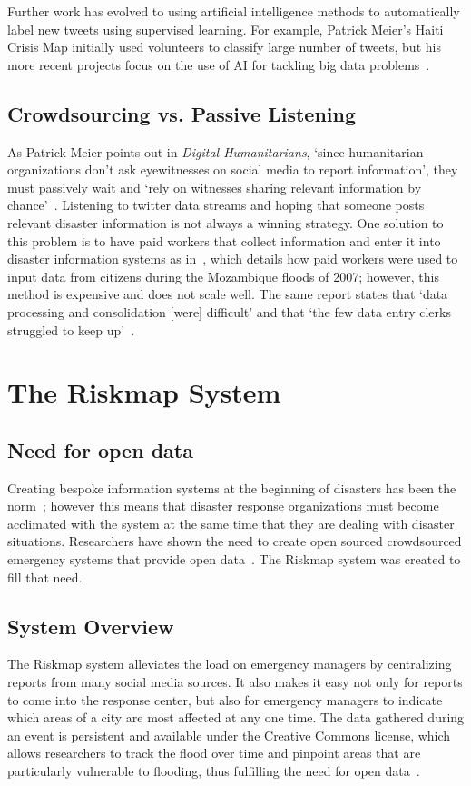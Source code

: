 Further work has evolved to using artificial intelligence methods to
automatically label new tweets using supervised learning. For example, Patrick
Meier's Haiti Crisis Map initially used volunteers to classify large number of
tweets, but his more recent projects focus on the use of AI for tackling big
data problems~\cite{meierDigitalHumanitariansHow2015}.
\subsection{Crowdsourcing vs. Passive Listening} 
As Patrick Meier points out in \textit{Digital Humanitarians}, `since
humanitarian organizations don't ask eyewitnesses on social media to report
information', they must passively wait and `rely on witnesses sharing relevant
information by chance'~\cite{meierDigitalHumanitariansHow2015}. Listening to
twitter data streams and hoping that someone posts relevant disaster information
is not always a winning strategy. One solution to this problem is to have paid
workers that collect information and enter it into disaster information systems
as in~\cite{aminDataNaturalDisasters2008}, which details how paid workers were
used to input data from citizens during the Mozambique floods of 2007; however,
this method is expensive and does not scale well. The same report states that
`data processing and consolidation [were] difficult' and that `the few data
entry clerks struggled to keep up'~\cite{aminDataNaturalDisasters2008}.

\section{The Riskmap System}\label{chap1:riskmap}

	\subsection{Need for open data} Creating bespoke information systems at
	the beginning of disasters has been the
	norm~\cite{aminDataNaturalDisasters2008}; however this means that
	disaster response organizations must become acclimated with the system
	at the same time that they are dealing with disaster situations.
	Researchers have shown the need to create open sourced crowdsourced
	emergency systems that provide open
	data~\cite{avvenutiNeedOpeningCrowdsourced2018a}. The Riskmap system was
	created to fill that need.

	\subsection{System Overview} The Riskmap system alleviates the load on
	emergency managers by centralizing reports from many social media
	sources. It also makes it easy not only for reports to come into the
	response center, but also for emergency managers to indicate which areas
	of a city are most affected at any one time. The data gathered during an
	event is persistent and available under the Creative Commons license,
	which allows researchers to track the flood over time and pinpoint areas
	that are particularly vulnerable to flooding, thus fulfilling the need
	for open data~\cite{holdernessSocialMediaGeoSocial2015a}.

